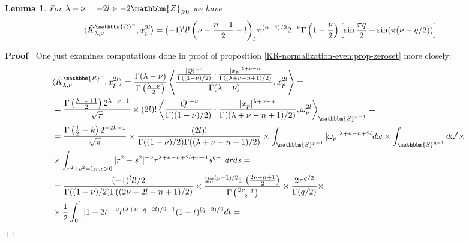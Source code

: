 \documentclass{article}
\newenvironment{proof}{\noindent\textbf{Proof\ }}{\hspace*{\fill}$\Box$\medskip}
\newtheorem{lemma}{Lemma}
\begin{document}
\begin{lemma}
  \label{resform:lem-from-regular-1-2}For $\lambda - \nu = - 2 l \in -
  2\mathbbm{Z}_{\geqslant 0}$ we have
  \[ \langle \tilde{K}_{\lambda, \nu}^{\mathbbm{R}^n}, x_p^{2 l} \rangle = (-
     1)^l l! \left( \nu - \frac{n - 1}{2} - l \right)_l \pi^{(n - 4) / 2} 2^{-
     \nu} \Gamma \left( 1 - \frac{\nu}{2} \right) \left[ \sin \frac{\pi q}{2}
     + \sin (\pi (\nu - q / 2)) \right] . \]
\end{lemma}

\begin{proof}
  One just examines computations done in proof of proposition
  \ref{KR-normalization-even:prop-zeroset} more closely:
  \begin{eqnarray}
    & \langle \tilde{K}_{\lambda, \nu}^{\mathbbm{R}^n}, x_p^{2 l} \rangle =
    \frac{\Gamma (\lambda - \nu)}{\Gamma \left( \frac{\lambda - \nu}{2}
    \right)} \left\langle \frac{\frac{| Q |^{- \nu}}{\Gamma ((1 - \nu) / 2)}
    \cdot \frac{| x_p |^{\lambda + \nu - n}}{\Gamma ((\lambda + \nu - n + 1) /
    2)}}{\Gamma (\lambda - \nu)}, x_p^{2 l} \right\rangle = &  \nonumber\\
    & = \frac{\Gamma \left( \frac{\lambda - \nu + 1}{2} \right) 2^{\lambda -
    \nu - 1}}{\sqrt{\pi}} \times (2 l) ! \left\langle \frac{| Q |^{-
    \nu}}{\Gamma ((1 - \nu) / 2)} \cdot \frac{| x_p |^{\lambda + \nu -
    n}}{\Gamma ((\lambda + \nu - n + 1) / 2)}, \omega_p^{2 l}
    \right\rangle_{\mathbbm{S}^{n - 1}} = &  \nonumber\\
    & = \frac{\Gamma \left( \frac{1}{2} - k \right) 2^{- 2 k -
    1}}{\sqrt{\pi}} \times \frac{(2 l) !}{\Gamma ((1 - \nu) / 2) \Gamma
    ((\lambda + \nu - n + 1) / 2)} \times \int_{\mathbbm{S}^{p - 1}} |
    \omega_p |^{\lambda + \nu - n + 2 l} d \omega \times \int_{\mathbbm{S}^{q
    - 1}} d \omega' \times &  \nonumber\\
    & \times \int_{r^2 + s^2 = 1 ; r, s > 0} | r^2 - s^2 |^{- \nu} r^{\lambda
    + \nu - n + 2 l + p - 1} s^{q - 1} d r d s = &  \nonumber\\
    & = \frac{(- 1)^l l! / 2}{\Gamma ((1 - \nu) / 2) \Gamma ((2 \nu - 2 l - n
    + 1) / 2)} \times \frac{2 \pi^{(p - 1) / 2} \Gamma \left( \frac{2 \nu - n
    + 1}{2} \right)}{\Gamma \left( \frac{2 \nu - q}{2} \right)} \times \frac{2
    \pi^{q / 2}}{\Gamma (q / 2)} \times &  \nonumber\\
    & \times \frac{1}{2} \int_0^1 | 1 - 2 t |^{- \nu} t^{(\lambda + \nu - q +
    2 l) / 2 - 1} (1 - t)^{(q - 2) / 2} d t = &  \nonumber\\

\end{eqnarray}
\end{proof}
\end{document}

